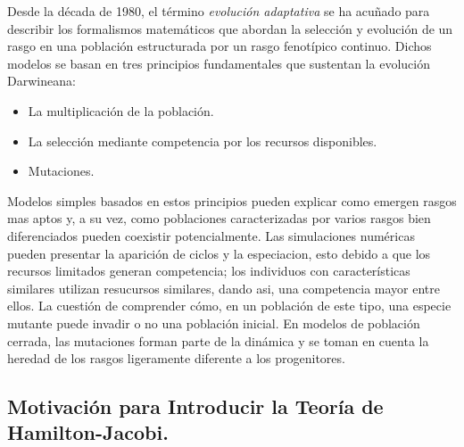 {{            \normalsize{\citep{Mirrahimi} Desde la década de 1980, el término \textit{evolución adaptativa} se ha acuñado para describir los formalismos matemáticos que abordan la selección y evolución de un rasgo en una población estructurada por un rasgo fenotípico continuo. Dichos modelos se basan en tres principios fundamentales que sustentan la evolución Darwineana:}
            
                \begin{itemize}
                    \item {
                    
                        \normalsize{La multiplicación de la población.}

                    }
                    
                    \item {
                    
                        \normalsize{La selección mediante competencia por los recursos disponibles.}
                    }
                    
                    \item {
                    
                        \normalsize{Mutaciones.}

                    }
                \end{itemize}
                
            \normalsize{Modelos simples basados en estos principios pueden explicar como emergen rasgos mas aptos y, a su vez, como poblaciones caracterizadas por varios rasgos bien diferenciados pueden coexistir potencialmente. Las simulaciones numéricas pueden presentar la aparición de ciclos y la especiacion, esto debido a que los recursos limitados generan competencia; los individuos con características similares utilizan resucursos similares, dando asi, una competencia mayor entre ellos. La cuestión de comprender cómo, en un población de este tipo, una especie mutante puede invadir o no una población inicial. En modelos de población cerrada, las mutaciones forman parte de la dinámica y se toman en cuenta la heredad de los rasgos ligeramente diferente a los progenitores.}
        }
        
        \subsection{Motivación para Introducir la Teoría de Hamilton-Jacobi.}

}

